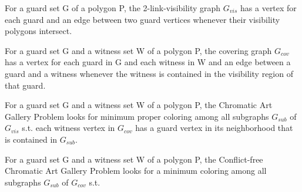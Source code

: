 \begin{definition}
For a guard set G of a polygon P, the 2-link-visibility graph $G_{vis}$ has a vertex for each guard and an edge between two guard vertices whenever their visibility polygons intersect.
\end{definition}

\begin{definition}
For a guard set G and a witness set W of a polygon P, the covering graph $G_{cov}$ has a vertex for each guard in G and each witness in W and an edge between a guard and a witness whenever the witness is contained in the visibility region of that guard.
\end{definition}

\begin{definition}
For a guard set G and a witness set W of a polygon P, the Chromatic Art Gallery Problem looks for minimum proper coloring among all subgraphs $G_{sub}$ of $G_{vis}$ s.t. each witness vertex in $G_{cov}$ has a guard vertex in its neighborhood that is contained in $G_{sub}$.
\end{definition}

\begin{definition}
For a guard set G and a witness set W of a polygon P, the Conflict-free Chromatic Art Gallery Problem looks for a minimum coloring among all subgraphs $G_{sub}$ of $G_{cov}$ s.t. 
\end{definition}